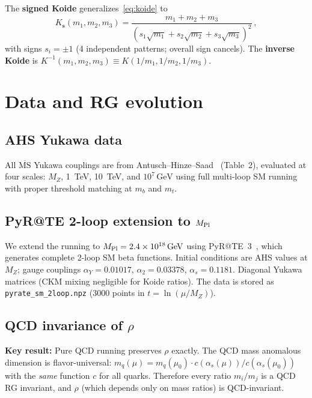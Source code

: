 \documentclass[11pt,a4paper]{article}
\newcommand{\GeV}{\,\text{GeV}}
\newcommand{\MZ}{M_Z}
\newcommand{\MPl}{M_{\rm Pl}}
\begin{document}
The \textbf{signed Koide} generalizes~\eqref{eq:koide} to
\begin{equation}
  K_{\mathbf{s}}(m_1, m_2, m_3)
  = \frac{m_1 + m_2 + m_3}
         {(s_1\sqrt{m_1} + s_2\sqrt{m_2} + s_3\sqrt{m_3})^2}\,,
  \label{eq:signed}
\end{equation}
with signs $s_i = \pm 1$ (4 independent patterns; overall sign cancels).
The \textbf{inverse Koide} is $K^{-1}(m_1,m_2,m_3) \equiv K(1/m_1,1/m_2,1/m_3)$.

\section{Data and RG evolution}
\label{sec:data}

\subsection{AHS Yukawa data}

All $\overline{\text{MS}}$ Yukawa couplings are from
Antusch--Hinze--Saad~\cite{AHS:2024} (Table~2), evaluated at four
scales: $\MZ$, 1~TeV, 10~TeV, and $10^7\GeV$ using full multi-loop
SM running with proper threshold matching at $m_b$ and $m_t$.

\subsection{PyR@TE 2-loop extension to $\MPl$}

We extend the running to $\MPl = 2.4 \times 10^{18}\GeV$ using
PyR@TE~3~\cite{PyRATE:2020}, which generates complete 2-loop SM
beta functions. Initial conditions are AHS values at $\MZ$;
gauge couplings $\alpha_Y = 0.01017$, $\alpha_2 = 0.03378$,
$\alpha_s = 0.1181$. Diagonal Yukawa matrices (CKM mixing negligible
for Koide ratios). The data is stored as \texttt{pyrate\_sm\_2loop.npz}
(3000 points in $t = \ln(\mu/\MZ)$).

\subsection{QCD invariance of $\rho$}
\label{sec:qcd}

\textbf{Key result:} Pure QCD running preserves $\rho$ exactly.
The QCD mass anomalous dimension is flavor-universal:
$m_q(\mu) = m_q(\mu_0) \cdot c(\alpha_s(\mu))/c(\alpha_s(\mu_0))$
with the \emph{same} function $c$ for all quarks. Therefore every
ratio $m_i/m_j$ is a QCD RG invariant, and $\rho$ (which depends
only on mass ratios) is QCD-invariant.
\end{document}
